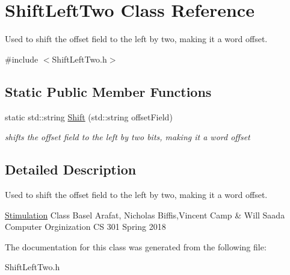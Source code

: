 \hypertarget{class_shift_left_two}{}\section{Shift\+Left\+Two Class Reference}
\label{class_shift_left_two}


Used to shift the offset field to the left by two, making it a word offset.  




{\ttfamily \#include $<$Shift\+Left\+Two.\+h$>$}

\subsection*{Static Public Member Functions}
\begin{DoxyCompactItemize}
\item 
\mbox{\label{class_shift_left_two_ac5c1981353db16983cd30c5acdee3622}} 
static std\+::string \mbox{\hyperlink{class_shift_left_two_ac5c1981353db16983cd30c5acdee3622}{Shift}} (std\+::string offset\+Field)
\begin{DoxyCompactList}\small\item\em shifts the offset field to the left by two bits, making it a word offset \end{DoxyCompactList}\end{DoxyCompactItemize}


\subsection{Detailed Description}
Used to shift the offset field to the left by two, making it a word offset. 

\mbox{\hyperlink{class_stimulation}{Stimulation}} Class Basel Arafat, Nicholas Biffis,Vincent Camp \& Will Saada Computer Orginization CS 301 Spring 2018 

The documentation for this class was generated from the following file\+:\begin{DoxyCompactItemize}
\item 
Shift\+Left\+Two.\+h\end{DoxyCompactItemize}
